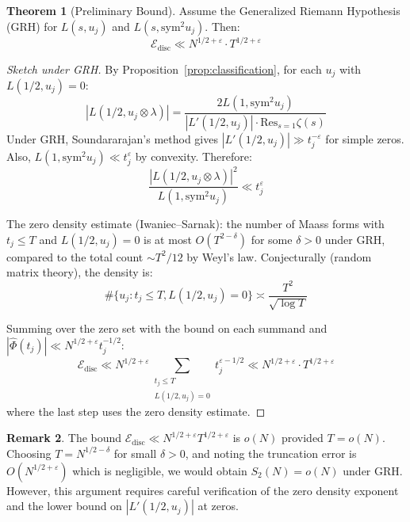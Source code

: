 \documentclass[11pt,a4paper]{article}
\theoremstyle{definition}
\newtheorem{theorem}{Theorem}[section]
\newtheorem{remark}[theorem]{Remark}
\newcommand{\Sym}{\mathrm{sym}}
\newcommand{\disc}{\mathrm{disc}}
\newcommand{\Res}{\mathrm{Res}}
\begin{document}
\begin{theorem}[Preliminary Bound]
\label{thm:prelim-bound}
Assume the Generalized Riemann Hypothesis (GRH) for $L(s, u_j)$ and $L(s, \Sym^2 u_j)$. Then:
\begin{equation}
\mathcal{E}_{\disc} \ll N^{1/2+\varepsilon} \cdot T^{1/2+\varepsilon}
\end{equation}
\end{theorem}

\begin{proof}[Sketch under GRH]
By Proposition~\ref{prop:classification}, for each $u_j$ with $L(1/2, u_j) = 0$:
\begin{equation}
|L(1/2, u_j \otimes \lambda)| = \frac{2L(1, \Sym^2 u_j)}{|L'(1/2, u_j)| \cdot \Res_{s=1}\zeta(s)}
\end{equation}
Under GRH, Soundararajan's method gives
$|L'(1/2, u_j)| \gg t_j^{-\varepsilon}$ for simple zeros.
Also, $L(1, \Sym^2 u_j) \ll t_j^{\varepsilon}$ by convexity. Therefore:
\begin{equation}
\frac{|L(1/2, u_j \otimes \lambda)|^2}{L(1, \Sym^2 u_j)} \ll t_j^{\varepsilon}
\end{equation}

The zero density estimate (Iwaniec--Sarnak): the number of Maass forms with $t_j \le T$ and $L(1/2, u_j) = 0$ is at most $O(T^{2-\delta})$ for some $\delta > 0$ under GRH, compared to the total count $\sim T^2/12$ by Weyl's law. Conjecturally (random matrix theory), the density is:
\begin{equation}
\#\{u_j : t_j \le T, L(1/2, u_j) = 0\} \asymp \frac{T^2}{\sqrt{\log T}}
\end{equation}

Summing over the zero set with the bound on each summand and $|\hat{\Phi}(t_j)| \ll N^{1/2+\varepsilon} t_j^{-1/2}$:
\begin{equation}
\mathcal{E}_{\disc} \ll N^{1/2+\varepsilon} \sum_{\substack{t_j \le T \\ L(1/2,u_j)=0}} t_j^{\varepsilon - 1/2} \ll N^{1/2+\varepsilon} \cdot T^{1/2+\varepsilon}
\end{equation}
where the last step uses the zero density estimate.
\end{proof}

\begin{remark}
The bound $\mathcal{E}_{\disc} \ll N^{1/2+\varepsilon} T^{1/2+\varepsilon}$ is $o(N)$ provided $T = o(N)$. Choosing $T = N^{1/2-\delta}$ for small $\delta > 0$, and noting the truncation error is $O(N^{1/2+\varepsilon})$ which is negligible, we would obtain $S_2(N) = o(N)$ under GRH. However, this argument requires careful verification of the zero density exponent and the lower bound on $|L'(1/2, u_j)|$ at zeros.
\end{remark}
\end{document}
